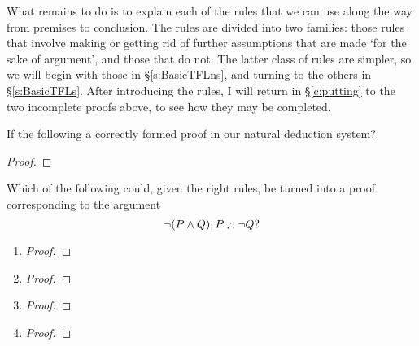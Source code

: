 What remains to do is to explain each of the rules that we can use along the way from premises to conclusion. The rules are divided into two families: those rules that involve making or getting rid of further assumptions that are made `for the sake of argument', and those that do not. The latter class of rules are simpler, so we will begin with those in §\ref{s:BasicTFLns}, and turning to the others in §\ref{s:BasicTFLs}. After introducing the rules, I will return in §\ref{c:putting} to the two incomplete proofs above, to see how they may be completed.


\practiceproblems
\problempart
If the following a correctly formed proof in our natural deduction system?
\begin{proof}
	\open
	\open
\end{proof}

\problempart
Which of the following could, given the right rules, be turned into a proof corresponding to the argument $$\neg(P \wedge Q), P \mathrel{\therefore} \neg Q?$$
\begin{multicols}{2}\noindent
	   \begin{enumerate}
    	\item\begin{proof}
    		\open
    		\have[\ ]{}{\vdots}
    	\end{proof}
    	\item\begin{proof}
    		\open
    		\have[\ ]{}{\vdots}
    		\close
    	\end{proof}
    	\item\begin{proof}
    		\have[\ ]{}{\vdots}
    	\end{proof}
    	\item\begin{proof}
    		\open
    		\have[\ ]{}{\vdots}
    	\end{proof}
    \end{enumerate}
\end{multicols}
 

